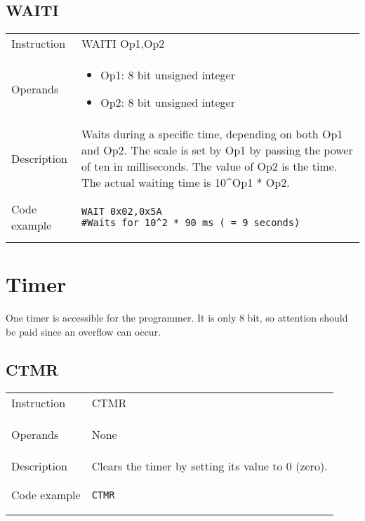 \subsection{WAITI}
\renewcommand*{\arraystretch}{2.0}
\begin{longtable}{P{3cm}P{9cm}}
\midrule
\noindent Instruction & WAITI Op1,Op2 \\
\noindent Operands &
\begin{itemize}[label={},noitemsep,leftmargin=*,topsep=0pt,partopsep=0pt, itemsep=1em]
\item Op1: 8 bit unsigned integer

\item Op2: 8 bit unsigned integer
\end{itemize}\\
\noindent Description & Waits during a specific time, depending on both Op1 and Op2. The scale is set by Op1 by passing the power of ten in milliseconds. The value of Op2 is the time. The actual waiting time is 10^Op1 * Op2. \\
\noindent Code example & 
\begin{lstlisting}
WAIT 0x02,0x5A
#Waits for 10^2 * 90 ms ( = 9 seconds)
\end{lstlisting} \\
\end{longtable}


\newpage

\section{Timer}
One timer is accessible for the programmer. It is only 8 bit, so attention should be paid since an overflow can occur.

\subsection{CTMR}
\renewcommand*{\arraystretch}{2.0}
\begin{longtable}{P{3cm}P{9cm}}
\midrule
\noindent Instruction & CTMR \\
\noindent Operands &
\begin{itemize}[label={},noitemsep,leftmargin=*,topsep=0pt,partopsep=0pt, itemsep=1em]None\end{itemize}\\
\noindent Description & Clears the timer by setting its value to 0 (zero). \\
\noindent Code example & 
\begin{lstlisting}
CTMR
\end{lstlisting} \\
\end{longtable}


